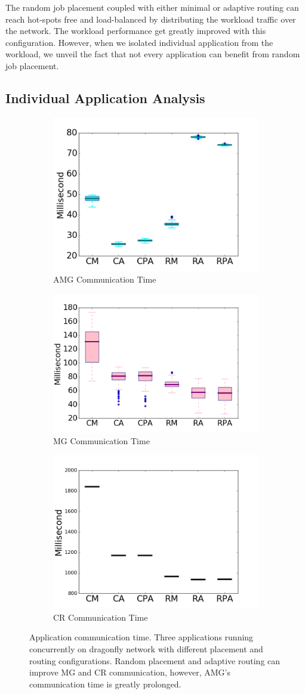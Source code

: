\documentclass[conference,compsoc]{IEEEtran}
\begin{document}
The random job placement coupled with either minimal or adaptive routing can reach hot-spots free and load-balanced by distributing the workload traffic over the network. The workload performance get greatly improved with this configuration. However, when we isolated individual application from the workload, we unveil the fact that not every application can benefit from random job placement. 


\subsection{Individual Application Analysis}

\begin{figure}[t!]
    \centering
    \begin{subfigure}[t]{0.32\textwidth}
        \centering
        \includegraphics[height=1.5 in]{amg/commtime}
        \caption{AMG Communication Time}
        \label{fig:amg-commtime}
    \end{subfigure}%
    \hspace{1em}%
    \begin{subfigure}[t]{0.32\textwidth}
        \centering
        \includegraphics[height=1.5 in]{mg/commtime}
        \caption{MG Communication Time}
        \label{fig:mg-commtime}
    \end{subfigure}%
    \begin{subfigure}[t]{0.32\textwidth}
        \centering
        \includegraphics[height=1.5 in]{cr/commtime}
        \caption{CR Communication Time}
        \label{fig:cr-commtime}
    \end{subfigure}%
   \caption{Application communication time. Three applications running concurrently on dragonfly network with different placement and routing configurations. Random placement and adaptive routing can improve MG and CR communication, however, AMG's communication time is greatly prolonged.}
   \label{fig:apps-commtime}
\end{figure}
\end{document}
